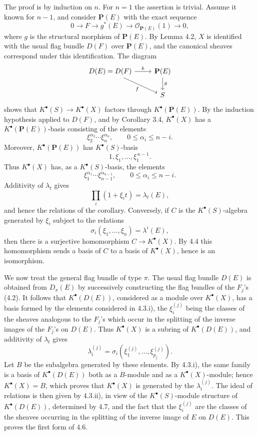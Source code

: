 \documentclass[11pt]{article}
\begin{document}
The proof is by induction on \(n\). For \(n=1\) the assertion is trivial. Assume it known for \(n-1\), and consider \(\mathbf P(E)\) with the exact sequence
\[
  0\longrightarrow F\longrightarrow g^*(E)\longrightarrow \mathcal O_{\mathbf P(E)}(1)\longrightarrow 0,
\]
where \(g\) is the structural morphism of \(\mathbf P(E)\). By Lemma 4.2, \(X\) is identified with the usual flag bundle \(D(F)\) over \(\mathbf P(E)\), and the canonical sheaves correspond under this identification. The diagram
\[
\begin{tikzcd}
D(E)=D(F) \arrow[r,"h"] \arrow[dr,"f"'] & \mathbf P(E) \arrow[d,"g"]\\
& S
\end{tikzcd}
\]
shows that \(K^\bullet(S)\to K^\bullet(X)\) factors through \(K^\bullet(\mathbf P(E))\). By the induction hypothesis applied to \(D(F)\), and by Corollary 3.4, \(K^\bullet(X)\) has a \(K^\bullet(\mathbf P(E))\)-basis consisting of the elements
\[
  \xi_2^{\alpha_2}\cdots \xi_n^{\alpha_n},
  \qquad 0\leq\alpha_i\leq n-i .
\]
Moreover, \(K^\bullet(\mathbf P(E))\) has \(K^\bullet(S)\)-basis
\[
  1,\xi_1,\ldots,\xi_1^{\,n-1}.
\]
Thus \(K^\bullet(X)\) has, as a \(K^\bullet(S)\)-basis, the elements
\[
  \xi_1^{\alpha_1}\cdots\xi_{n-1}^{\alpha_{n-1}},
  \qquad 0\leq \alpha_i\leq n-i.
\]
Additivity of \(\lambda_t\) gives
\[
  \prod_i(1+\xi_i t)=\lambda_t(E),
\]
and hence the relations of the corollary. Conversely, if \(C\) is the \(K^\bullet(S)\)-algebra generated by \(\xi_i\) subject to the relations
\[
  \sigma_i(\xi_1,\ldots,\xi_n)=\lambda^i(E),
\]
then there is a surjective homomorphism \(C\to K^\bullet(X)\). By 4.4 this homomorphism sends a basis of \(C\) to a basis of \(K^\bullet(X)\), hence is an isomorphism.

We now treat the general flag bundle of type \(\pi\). The usual flag bundle \(D(E)\) is obtained from \(D_\pi(E)\) by successively constructing the flag bundles of the \(F_j\)'s (4.2). It follows that \(K^\bullet(D(E))\), considered as a module over \(K^\bullet(X)\), has a basis formed by the elements considered in 4.3.i), the \(\xi_i^{(j)}\) being the classes of the sheaves analogous to the \(F_j\)'s which occur in the splitting of the inverse images of the \(F_j\)'s on \(D(E)\). Thus \(K^\bullet(X)\) is a subring of \(K^\bullet(D(E))\), and additivity of \(\lambda_t\) gives
\[
  \lambda_i^{(j)}=\sigma_i(\xi_1^{(j)},\ldots,\xi_{p_j}^{(j)}).
\]
Let \(B\) be the subalgebra generated by these elements. By 4.3.i), the same family is a basis of \(K^\bullet(D(E))\) both as a \(B\)-module and as a \(K^\bullet(X)\)-module; hence \(K^\bullet(X)=B\), which proves that \(K^\bullet(X)\) is generated by the \(\lambda_i^{(j)}\). The ideal of relations is then given by 4.3.ii), in view of the \(K^\bullet(S)\)-module structure of \(K^\bullet(D(E))\), determined by 4.7, and the fact that the \(\xi_i^{(j)}\) are the classes of the sheaves occurring in the splitting of the inverse image of \(E\) on \(D(E)\). This proves the first form of 4.6.
\end{document}
